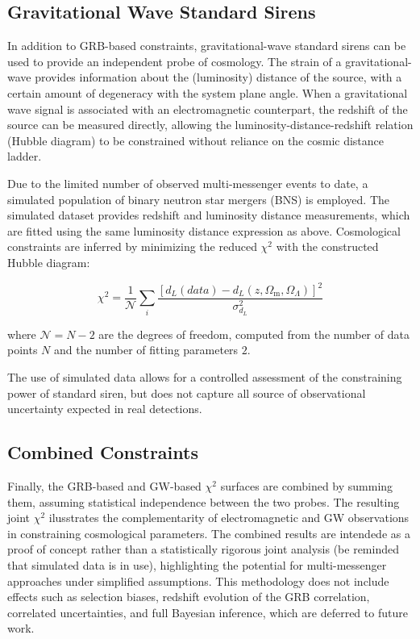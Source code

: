 \documentclass[
    aps,
    prd,
    twocolumn,
    nofootinbib,
    floatfix,
    superscriptaddress
]{revtex4-2}
\newcommand{\Om}{\Omega_{\mathrm{m}}}
\newcommand{\Ol}{\Omega_\Lambda}
\begin{document}
\subsection{Gravitational Wave Standard Sirens}

In addition to GRB-based constraints, gravitational-wave standard sirens can be used to provide an independent probe of cosmology. The strain of a gravitational-wave provides information about the (luminosity) distance of the source, with a certain amount of degeneracy with the system plane angle. When a gravitational wave signal is associated with an electromagnetic counterpart, the redshift of the source can be measured directly, allowing the luminosity-distance-redshift relation (Hubble diagram) to be constrained without reliance on the cosmic distance ladder.

Due to the limited number of observed multi-messenger events to date, a simulated population of binary neutron star mergers (BNS) is employed. The simulated dataset provides redshift and luminosity distance measurements, which are fitted using the same luminosity distance expression as above. Cosmological constraints are inferred by minimizing the reduced $\chi^2$ with the constructed Hubble diagram:

\begin{equation}
    \chi^2 = \frac{1}{\mathcal{N}} \sum_i \frac{\left[d_L(data) - d_L(z, \Om, \Ol)\right]^2}{\sigma_{d_L} ^2}
\end{equation}

where $\mathcal{N} = N - 2$ are the degrees of freedom, computed from the number of data points $N$ and the number of fitting parameters $2$.

The use of simulated data allows for a controlled assessment of the constraining power of standard siren, but does not capture all source of observational uncertainty expected in real detections. %

\subsection{Combined Constraints}

Finally, the GRB-based and GW-based $\chi^2$ surfaces are combined by summing them, assuming statistical independence between the two probes. The resulting joint $\chi^2$ ilusstrates the complementarity of electromagnetic and GW observations in constraining cosmological parameters. The combined results are intendede as a proof of concept rather than a statistically rigorous joint analysis (be reminded that simulated data is in use), highlighting the potential for multi-messenger approaches under simplified assumptions. This methodology does not include effects such as selection biases, redshift evolution of the GRB correlation, correlated uncertainties, and full Bayesian inference, which are deferred to future work.
\end{document}
